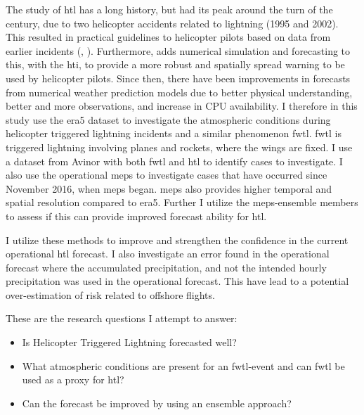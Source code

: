 The study of \acrshort{htl} has a long history, but had its peak around the turn of the century, due to two helicopter accidents related to lightning (1995 and 2002). This resulted in practical guidelines to helicopter pilots based on data from earlier incidents (\cite{lande}, \cite{hardwick}). Furthermore, \cite{wilkinson} adds numerical simulation and forecasting to this, with the \acrfull{hti}, to provide a more robust and spatially spread warning to be used by helicopter pilots. Since then, there have been improvements in forecasts from numerical weather prediction models due to better physical understanding, better and more observations, and increase in CPU availability. I therefore in this study use the \acrfull{era5} dataset to investigate the atmospheric conditions during helicopter triggered lightning incidents and a similar phenomenon \acrfull{fwtl}. \acrshort{fwtl} is triggered lightning involving planes and rockets, where the wings are fixed. I use a dataset from Avinor with both \acrshort{fwtl} and \acrshort{htl} to identify cases to investigate. I also use the operational \acrfull{meps} to investigate cases that have occurred since November 2016, when \acrshort{meps} began. \acrshort{meps} also provides higher temporal and spatial resolution compared to \acrshort{era5}. Further I utilize the \acrshort{meps}-ensemble members to assess if this can provide improved forecast ability for \acrshort{htl}.

I utilize these methods to improve and strengthen the confidence in the current operational \acrshort{htl} forecast. I also investigate an error found in the operational forecast where the accumulated precipitation, and not the intended hourly precipitation was used in the operational forecast. This have lead to a potential over-estimation of risk related to offshore flights.

These are the research questions I attempt to answer:
\begin{itemize}	
    \item Is Helicopter Triggered Lightning forecasted well?
    \item What atmospheric conditions are present for an \acrshort{fwtl}-event and can \acrshort{fwtl} be used as a proxy for \acrshort{htl}? 
    \item Can the forecast be improved by using an ensemble approach?
\end{itemize}






